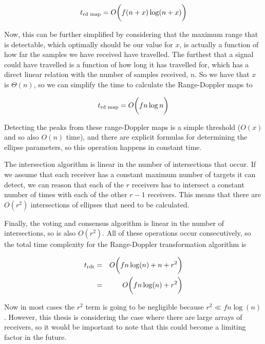 \documentclass[12pt,openany,a4paper]{book}
\begin{document}
\begin{equation}
t_{\textnormal{rd map}} = O\bigg(f(n+x) \log (n+x) \bigg)
\end{equation}

\bigskip

Now, this can be further simplified by considering that the maximum range that is detectable, which optimally should be our value for $x$, is actually a function of how far the samples we have received have travelled. The furthest that a signal could have travelled is a function of how long it has travelled for, which has a direct linear relation with the number of samples received, $n$. So we have that $x$ is $\Theta(n)$, so we can simplify the time to calculate the Range-Doppler maps to

\begin{equation}
t_{\textnormal{rd map}} = O\bigg(fn \log n \bigg)
\end{equation}

\bigskip

Detecting the peaks from these range-Doppler maps is a simple threshold ($O(x)$ and so also $O(n)$ time), and there are explicit formulas for determining the ellipse parameters, so this operation happens in constant time.

\bigskip
The intersection algorithm is linear in the number of intersections that occur. If we assume that each receiver has a constant maximum number of targets it can detect, we can reason that each of the $r$ receivers has to intersect a constant number of times with each of the other $r-1$ receivers. This means that there are $O(r^2)$ intersections of ellipses that need to be calculated.

\bigskip

Finally, the voting and consensus algorithm is linear in the number of intersections, so is also $O(r^2)$. All of these operations occur consecutively, so the total time complexity for the Range-Doppler transformation algorithm is

\begin{eqnarray}
t_{\textnormal{rdt}} &=&  O\bigg(fn \log (n) + n + r^2 \bigg) \\
&=&  O\bigg(fn \log (n) + r^2 \bigg)
\end{eqnarray}

Now in most cases the $r^2$ term is going to be negligible because $r^2 \ll fn \log (n)$. However, this thesis is considering the case where there are large arrays of receivers, so it would be important to note that this could become a limiting factor in the future.
\end{document}
